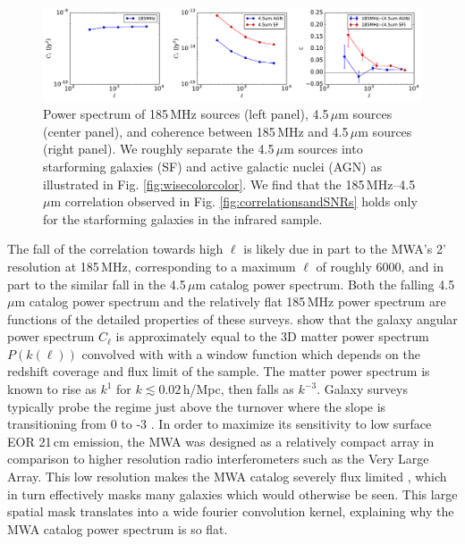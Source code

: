 \documentclass{emulateapj}
\begin{document}
\begin{figure}[h]
\centering
\includegraphics[width=7in]{images/mwa_wise_qsoagn_gal_xspec.pdf}
\caption{Power spectrum of 185\,MHz sources (left panel), 4.5\,$\mu$m sources (center panel), and coherence between 185\,MHz and 4.5\,$\mu$m sources (right panel). We roughly separate the 4.5\,$\mu$m sources into starforming galaxies (SF) and active galactic nuclei (AGN) as illustrated in Fig.  \ref{fig:wisecolorcolor}. We find that the 185\,MHz--4.5\,$\mu$m correlation observed in Fig. \ref{fig:correlationsandSNRs} holds only for the starforming galaxies in the infrared sample. }
\label{fig:wisexspec}
\end{figure}


The fall of the correlation towards high $\ell$ is likely due in part to the MWA's 2' resolution at 185\,MHz, corresponding to a maximum $\ell$ of roughly 6000, and in part to the similar fall in the 4.5\,$\mu$m catalog power spectrum. Both the falling 4.5\,$\mu$m catalog power spectrum and the relatively flat 185\,MHz power spectrum are functions of the detailed properties of these surveys. \citet{tegmark02,dodelson02} show that the galaxy angular power spectrum $C_\ell$ is approximately equal to the 3D matter power spectrum $P(k(\ell))$ convolved with with a window function which depends on the redshift coverage and flux limit of the sample. The matter power spectrum is known to rise as $k^{1}$ for $k\lesssim0.02$\,h/Mpc, then falls as $k^{-3}$. Galaxy surveys typically probe the regime just above the turnover where the slope is transitioning from 0 to -3 \citep{tegmark02b}. In order to maximize its sensitivity to low surface EOR 21\,cm emission, the MWA was designed as a relatively compact array in comparison to higher resolution radio interferometers such as the Very Large Array. This low resolution makes the MWA catalog severely flux limited \citep{PattiCatalog1}, which in turn effectively masks many galaxies which would otherwise be seen. This large spatial mask translates into a wide fourier convolution kernel, explaining why the MWA catalog power spectrum is so flat. 
\end{document}
